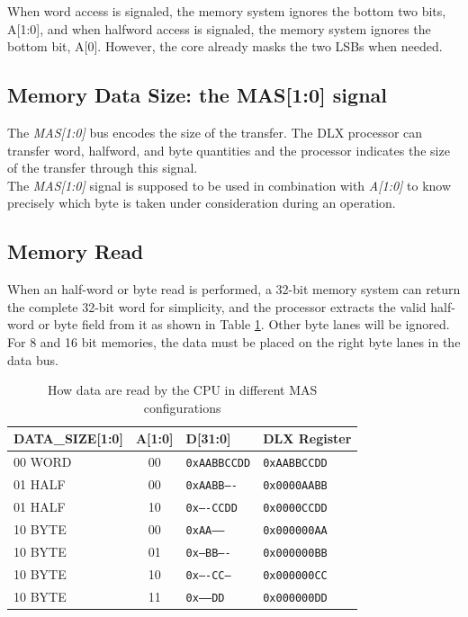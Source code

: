 When word access is signaled, the memory system ignores the bottom two bits, A[1:0], and when halfword access is signaled, the memory system ignores the bottom bit, A[0]. However, the core already masks the two LSBs when needed.

\subsection{Memory Data Size: the MAS[1:0] signal}
\label{mas}

The \emph{MAS[1:0]} bus encodes the size of the transfer. The DLX processor can transfer word, halfword, and byte quantities and the processor indicates the size of the transfer through this signal.\\

The \emph{MAS[1:0]} signal is supposed to be used in combination with \emph{A[1:0]} to know precisely which byte is taken under consideration during an operation.

\subsection{Memory Read}

When an half-word or byte read is performed, a 32-bit memory system can return the complete 32-bit word for simplicity, and the processor extracts the valid half-word or byte field from it as shown in Table \ref{table:memory_read_configuration}. Other byte lanes will be ignored. For 8 and 16 bit memories, the data must be placed on the right byte lanes in the data bus.

\begin{table}[H]
    \centering
    \begin{tabular}{|l|c|l|l|}
    \hline
        DATA\_SIZE[1:0] & A[1:0] & D[31:0] & DLX Register \\ \hline
        00 WORD & 00 & \texttt{0xAABBCCDD} & \texttt{0xAABBCCDD} \\ \hline
        01 HALF & 00 & \texttt{0xAABB----} & \texttt{0x0000AABB} \\ \hline
        01 HALF & 10 & \texttt{0x----CCDD} & \texttt{0x0000CCDD} \\ \hline
        10 BYTE & 00 & \texttt{0xAA------} & \texttt{0x000000AA} \\ \hline
        10 BYTE & 01 & \texttt{0x--BB----} & \texttt{0x000000BB} \\ \hline
        10 BYTE & 10 & \texttt{0x----CC--} & \texttt{0x000000CC} \\ \hline
        10 BYTE & 11 & \texttt{0x------DD} & \texttt{0x000000DD} \\ \hline
    \end{tabular}
    \caption{How data are read by the CPU in different MAS configurations}
    \label{table:memory_read_configuration}
\end{table}

